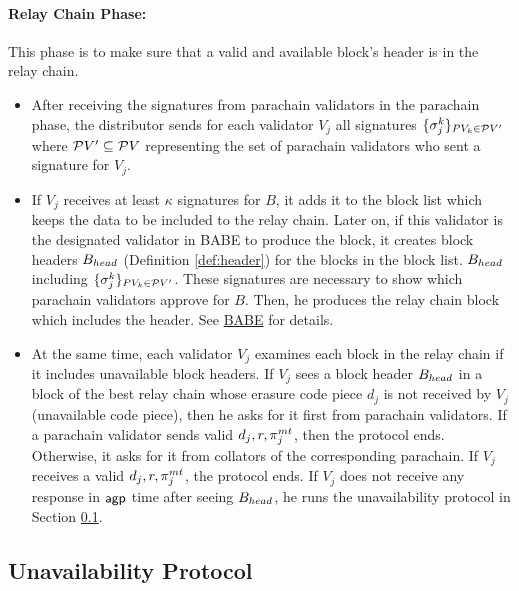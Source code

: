  


\paragraph{Relay Chain Phase:} This phase is to make sure that a valid and available block's header is in the relay chain. 

\begin{itemize}
    \item After receiving the signatures from parachain validators in the parachain phase, the distributor sends  for each validator $V_j$ all signatures  $\{\sigma_j^k\}_{PV_k \in \mathcal{P}V'} $ where $\mathcal{P}V' \subseteq \mathcal{P}V$ representing the set of parachain validators who sent a signature for $V_j$. 

    \item If $V_j$ receives at least $\kappa$ signatures for $B$, it adds it to the block list which keeps the data to be included to the relay chain. Later on, if this validator is the designated validator in BABE to produce the block, it creates block headers $B_{head}$ (Definition \ref{def:header}) for the blocks in the block list. $B_{head}$ including $\{\sigma_j^k\}_{PV_k \in \mathcal{P}V'} $.  These signatures are necessary to show which parachain validators approve for $B$. Then, he produces the relay chain block which includes the header. See \href{http://research.web3.foundation/en/latest/polkadot/BABE/Babe/}{BABE} for details.

    \item At the same time, each validator $V_j$ examines  each block in the relay chain if it includes unavailable block headers. If $V_j$ sees a block header $B_{head}$ in a block of the best relay chain whose erasure code piece $d_j$ is not received by $V_j$ (unavailable code piece), then he asks for it first from parachain validators. If a parachain validator sends valid $d_j, r, \pi^{mt}_j $, then the protocol ends. Otherwise, it asks for it from collators of the corresponding parachain. If $V_j$ receives a valid $d_j, r, \pi^{mt}_j $, the protocol ends. If $V_j$ does not receive any response in $\mathsf{agp}$ time after seeing $B_{head}$, he runs the unavailability protocol in Section \ref{sec:unavail}.

\end{itemize}

\subsection{Unavailability Protocol}
\label{sec:unavail}

